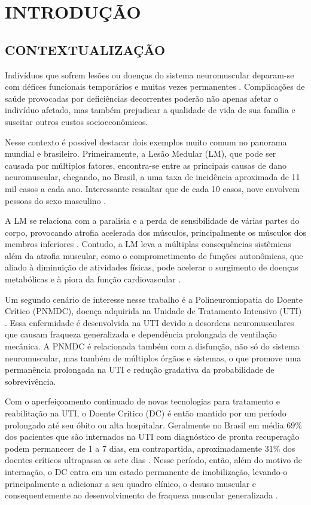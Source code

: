 \chapter{INTRODUÇÃO} 
\label{sec:cap1}

\section{CONTEXTUALIZAÇÃO} 
Indivíduos que sofrem lesões ou doenças do sistema neuromuscular deparam-se com défices funcionais temporários e muitas vezes permanentes \cite{Durand2005}. Complicações de saúde provocadas por deficiências decorrentes poderão não apenas afetar o indivíduo afetado, mas também prejudicar a qualidade de vida de sua família e suscitar outros custos socioeconômicos. 

Nesse contexto é possível destacar dois exemplos muito comum no panorama mundial e brasileiro. Primeiramente, a Lesão Medular (\acrshort{LM}), que pode ser causada por múltiplos fatores, encontra-se entre as principais causas de dano neuromuscular, chegando, no Brasil, a uma taxa de incidência aproximada de 11 mil casos a cada ano. Interessante ressaltar que de cada 10 casos, nove envolvem pessoas do sexo masculino \cite{Astur2014, Masini2001}.

A \acrshort{LM} se relaciona com a paralisia e a perda de sensibilidade de várias partes do corpo, provocando atrofia acelerada dos músculos, principalmente os músculos dos membros inferiores \cite{Faria2006}. Contudo, a \acrshort{LM} leva a múltiplas consequências sistêmicas além da atrofia muscular, como o comprometimento de funções autonômicas, que aliado à diminuição de atividades físicas, pode acelerar o surgimento de doenças metabólicas e à piora da função cardiovascular \cite{Faria2006}.

Um segundo cenário de interesse nesse trabalho é a Polineuromiopatia do Doente Crítico (\acrshort{PNMDC}), doença adquirida na Unidade de Tratamento Intensivo (\acrshort{UTI}) \cite{Zamora2013, Miranda2013}. Essa enfermidade é desenvolvida na \acrshort{UTI} devido a desordens neuromusculares que causam fraqueza generalizada e dependência prolongada de ventilação mecânica. A \acrshort{PNMDC} é relacionada também com a disfunção, não só do sistema neuromuscular, mas também de múltiplos órgãos e sistemas, o que promove uma permanência prolongada na \acrshort{UTI} e redução gradativa da probabilidade de sobrevivência.

Com o aperfeiçoamento continuado de novas tecnologias para tratamento e reabilitação na \acrshort{UTI}, o Doente Critico (\acrshort{DC}) é então mantido por um período prolongado até seu óbito ou alta hospitalar.  Geralmente no Brasil em média 69\% dos pacientes que são internados na \acrshort{UTI} com diagnóstico de pronta recuperação podem permanecer de 1 a 7 dias, em contrapartida, aproximadamente 31\% dos doentes críticos ultrapassa os sete dias \cite{Abelha2006} \cite{Abelha2006}. Nesse período, então, além do motivo de internação, o \acrshort{DC} entra em um estado permanente de imobilização, levando-o principalmente a adicionar a seu quadro clínico, o desuso muscular e consequentemente ao desenvolvimento de fraqueza muscular generalizada \cite{Miranda2013}.

